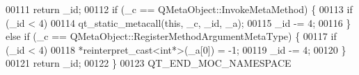 \begin{DoxyCode}
00111         \textcolor{keywordflow}{return} \_id;
00112     \textcolor{keywordflow}{if} (\_c == QMetaObject::InvokeMetaMethod) \{
00113         \textcolor{keywordflow}{if} (\_id < 4)
00114             qt\_static\_metacall(\textcolor{keyword}{this}, \_c, \_id, \_a);
00115         \_id -= 4;
00116     \} \textcolor{keywordflow}{else} \textcolor{keywordflow}{if} (\_c == QMetaObject::RegisterMethodArgumentMetaType) \{
00117         \textcolor{keywordflow}{if} (\_id < 4)
00118             *\textcolor{keyword}{reinterpret\_cast<}\textcolor{keywordtype}{int}*\textcolor{keyword}{>}(\_a[0]) = -1;
00119         \_id -= 4;
00120     \}
00121     \textcolor{keywordflow}{return} \_id;
00122 \}
00123 QT\_END\_MOC\_NAMESPACE
\end{DoxyCode}
